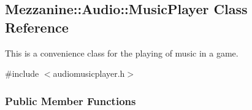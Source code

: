 \hypertarget{classMezzanine_1_1Audio_1_1MusicPlayer}{
\subsection{Mezzanine::Audio::MusicPlayer Class Reference}
\label{classMezzanine_1_1Audio_1_1MusicPlayer}
}


This is a convenience class for the playing of music in a game.  




{\ttfamily \#include $<$audiomusicplayer.h$>$}

\subsubsection*{Public Member Functions}

